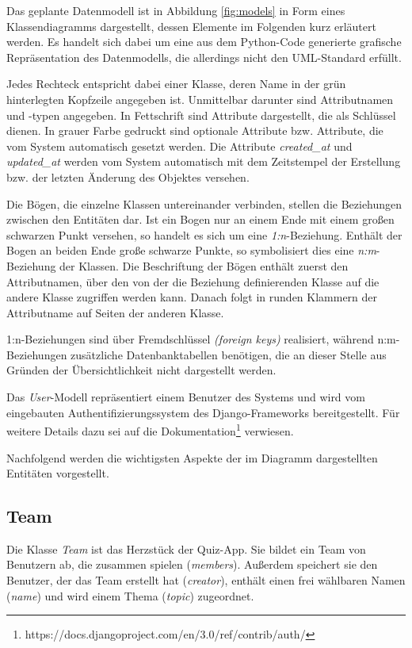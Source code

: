\documentclass[a4paper,11pt,listof=numbered,glossary=totoc,parskip=half,toc=bib]{scrreprt}
\begin{document}
	Das geplante Datenmodell ist in Abbildung \ref{fig:models} in Form eines Klassendiagramms dargestellt, dessen Elemente im Folgenden kurz erläutert werden. Es handelt sich dabei um eine aus dem Python-Code generierte grafische Repräsentation des Datenmodells, die allerdings nicht den UML-Standard erfüllt.
	
	Jedes Rechteck entspricht dabei einer Klasse, deren Name in der grün hinterlegten Kopfzeile angegeben ist. Unmittelbar darunter sind Attributnamen und -typen angegeben. In Fettschrift sind Attribute dargestellt, die als Schlüssel dienen. In grauer Farbe gedruckt sind optionale Attribute bzw. Attribute, die vom System automatisch gesetzt werden. Die Attribute \textit{created\_{}at} und \textit{updated\_{}at} werden vom System automatisch mit dem Zeitstempel der Erstellung bzw. der letzten Änderung des Objektes versehen.
	
	Die Bögen, die einzelne Klassen untereinander verbinden, stellen die Beziehungen zwischen den Entitäten dar. Ist ein Bogen nur an einem Ende mit einem großen schwarzen Punkt versehen, so handelt es sich um eine \textit{1:n}-Beziehung. Enthält der Bogen an beiden Ende große schwarze Punkte, so symbolisiert dies eine \textit{n:m}-Beziehung der Klassen. Die Beschriftung der Bögen enthält zuerst den Attributnamen, über den von der die Beziehung definierenden Klasse auf die andere Klasse zugriffen werden kann. Danach folgt in runden Klammern der Attributname auf Seiten der anderen Klasse.
	
	1:n-Beziehungen sind über Fremdschlüssel \textit{(foreign keys)} realisiert, während n:m-Beziehungen zusätzliche Datenbanktabellen benötigen, die an dieser Stelle aus Gründen der Übersichtlichkeit nicht dargestellt werden.
	
	Das \textit{User}-Modell repräsentiert einem Benutzer des Systems und wird vom eingebauten Authentifizierungssystem des Django-Frameworks bereitgestellt. Für weitere Details dazu sei auf die Dokumentation\footnote{https://docs.djangoproject.com/en/3.0/ref/contrib/auth/} verwiesen.
	
	Nachfolgend werden die wichtigsten Aspekte der im Diagramm dargestellten Entitäten vorgestellt.
	
	\subsection{Team}
	Die Klasse \textit{Team} ist das Herzstück der Quiz-App. Sie bildet ein Team von Benutzern ab, die zusammen spielen (\textit{members}). Außerdem speichert sie den Benutzer, der das Team erstellt hat (\textit{creator}), enthält einen frei wählbaren Namen (\textit{name}) und wird einem Thema (\textit{topic}) zugeordnet.
	
\end{document}
